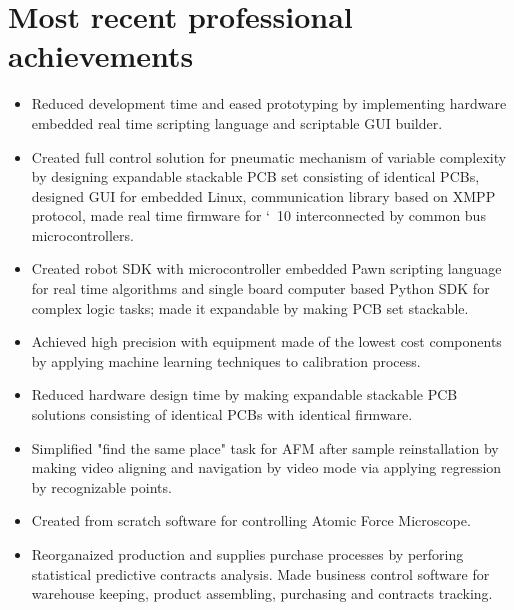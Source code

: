 \vspace*{-4mm}
\section{Most recent professional achievements}
\begin{itemize}

\item Reduced development time and eased prototyping by implementing hardware embedded real time scripting language and scriptable GUI builder.

\item Created full control solution for pneumatic mechanism of variable complexity by designing expandable stackable PCB set consisting of identical PCBs, designed GUI for embedded Linux, communication library based on XMPP protocol, made real time firmware for \char`~10 interconnected by common bus microcontrollers.

\item Created robot SDK with microcontroller embedded Pawn scripting language for real time algorithms and single board computer based Python SDK for complex logic tasks; made it expandable by making PCB set stackable.

\item Achieved high precision with equipment made of the lowest cost components by applying machine learning techniques to calibration process.

\item Reduced hardware design time by making expandable stackable PCB solutions consisting of identical PCBs with identical firmware.

\item Simplified "find the same place" task for AFM after sample reinstallation by making video aligning and navigation by video mode via applying regression by recognizable points.

\item Created from scratch software for controlling Atomic Force Microscope.

\item Reorganaized production and supplies purchase processes by perforing statistical predictive contracts analysis. Made business control software for warehouse keeping, product assembling, purchasing and contracts tracking.

\end{itemize}

\vspace*{-4mm}
